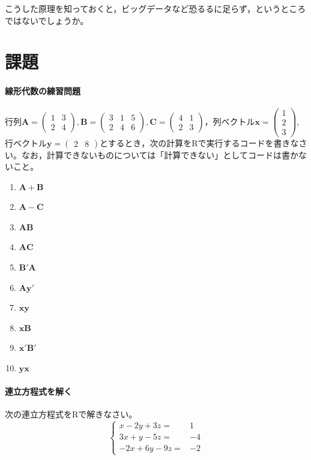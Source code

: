 \documentclass{ltjsbook}
\begin{document}
こうした原理を知っておくと，ビッグデータなど恐るるに足らず，というところではないでしょうか。

\section{課題}
\paragraph{線形代数の練習問題}行列$\bm{A}=\begin{pmatrix}1 & 3 \\2 & 4\end{pmatrix},\bm{B}=\begin{pmatrix}3&1&5\\2&4&6\end{pmatrix},\bm{C}=\begin{pmatrix}4&1\\2&3\end{pmatrix}$，列ベクトル$\bm{x}=\begin{pmatrix}1\\2\\3\end{pmatrix}$,行ベクトル$\bm{y}=\begin{pmatrix}2&8\end{pmatrix}$とするとき，次の計算をRで実行するコードを書きなさい。なお，計算できないものについては「計算できない」としてコードは書かないこと。
\begin{enumerate}
    \item $\bm{A}+\bm{B}$
    \item $\bm{A}-\bm{C}$
    \item $\bm{AB}$
    \item $\bm{AC}$
    \item $\bm{B}'\bm{A}$
    \item $\bm{A}\bm{y}'$
    \item $\bm{xy}$
    \item $\bm{xB}$
    \item $\bm{x}'\bm{B}'$
    \item $\bm{yx}$
\end{enumerate}

\paragraph{連立方程式を解く}次の連立方程式をRで解きなさい。
\[
\left\{\begin{array}{rr}x-2 y+3 z= & 1 \\ 3 x+y-5 z= & -4 \\ -2 x+6 y-9 z= & -2\end{array}\right.
\]
\end{document}
